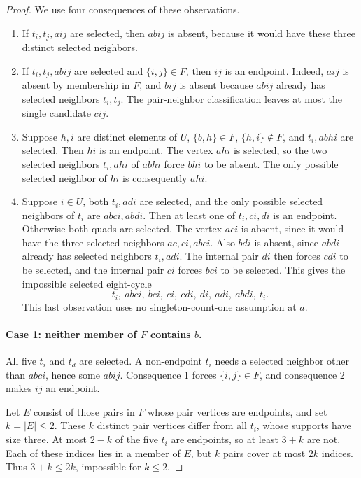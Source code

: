 \documentclass[11pt,a4paper]{article}
\theoremstyle{definition}
\theoremstyle{remark}
\begin{document}
\begin{proof}
We use four consequences of these observations.
\begin{enumerate}
\item If $t_i,t_j,aij$ are selected, then $abij$ is absent, because it would have these three distinct selected neighbors.
\item If $t_i,t_j,abij$ are selected and $\{i,j\}\in F$, then $ij$ is an endpoint. Indeed, $aij$ is absent by membership in $F$, and $bij$ is absent because $abij$ already has selected neighbors $t_i,t_j$. The pair-neighbor classification leaves at most the single candidate $cij$.
\item Suppose $h,i$ are distinct elements of $U$, $\{b,h\}\in F$, $\{h,i\}\notin F$, and $t_i,abhi$ are selected. Then $hi$ is an endpoint. The vertex $ahi$ is selected, so the two selected neighbors $t_i,ahi$ of $abhi$ force $bhi$ to be absent. The only possible selected neighbor of $hi$ is consequently $ahi$.
\item Suppose $i\in U$, both $t_i,adi$ are selected, and the only possible selected neighbors of $t_i$ are $abci,abdi$. Then at least one of $t_i,ci,di$ is an endpoint. Otherwise both quads are selected. The vertex $aci$ is absent, since it would have the three selected neighbors $ac,ci,abci$. Also $bdi$ is absent, since $abdi$ already has selected neighbors $t_i,adi$. The internal pair $di$ then forces $cdi$ to be selected, and the internal pair $ci$ forces $bci$ to be selected. This gives the impossible selected eight-cycle
\[
t_i,\ abci,\ bci,\ ci,\ cdi,\ di,\ adi,\ abdi,\ t_i.
\]
This last observation uses no singleton-count-one assumption at $a$.
\end{enumerate}

\paragraph{Case 1: neither member of $F$ contains $b$.}
All five $t_i$ and $t_d$ are selected. A non-endpoint $t_i$ needs a selected neighbor other than $abci$, hence some $abij$. Consequence 1 forces $\{i,j\}\in F$, and consequence 2 makes $ij$ an endpoint.

Let $E$ consist of those pairs in $F$ whose pair vertices are endpoints, and set $k=|E|\le2$. These $k$ distinct pair vertices differ from all $t_i$, whose supports have size three. At most $2-k$ of the five $t_i$ are endpoints, so at least $3+k$ are not. Each of these indices lies in a member of $E$, but $k$ pairs cover at most $2k$ indices. Thus $3+k\le2k$, impossible for $k\le2$.


\end{proof}
\end{document}
